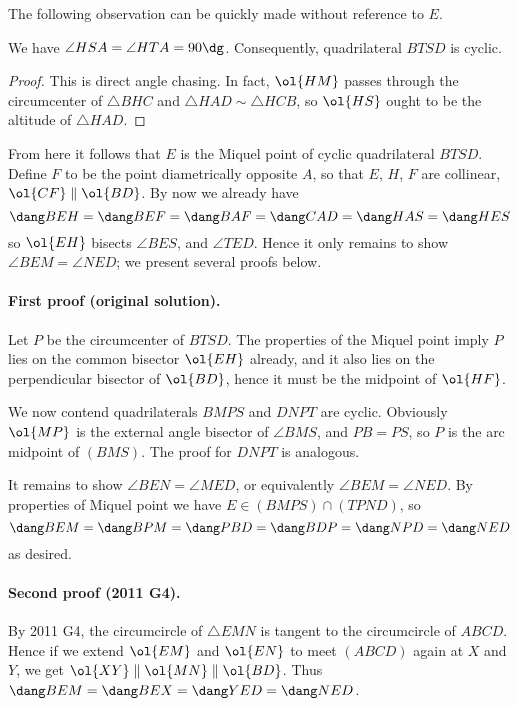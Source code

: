 The following observation can be quickly made
without reference to $E$.
\begin{lemma*}
  We have $\angle HSA = \angle HTA = 90\dg$.
  Consequently, quadrilateral $BTSD$ is cyclic.
\end{lemma*}
\begin{proof}
  This is direct angle chasing.
  In fact, $\ol{HM}$ passes through the circumcenter of $\triangle BHC$
  and $\triangle HAD \sim \triangle HCB$,
  so $\ol{HS}$ ought to be the altitude of $\triangle HAD$.
\end{proof}

From here it follows that $E$ is the Miquel point of
cyclic quadrilateral $BTSD$.
Define $F$ to be the point diametrically opposite $A$,
so that $E$, $H$, $F$ are collinear, $\ol{CF} \parallel \ol{BD}$.
By now we already have
\[ \dang BEH = \dang BEF = \dang BAF = \dang CAD = \dang HAS = \dang HES \]
so $\ol{EH}$ bisects $\angle BES$, and $\angle TED$.
Hence it only remains to show $\angle BEM = \angle NED$;
we present several proofs below.

\paragraph{First proof (original solution).}
Let $P$ be the circumcenter of $BTSD$.
The properties of the Miquel point imply $P$ lies on
the common bisector $\ol{EH}$ already,
and it also lies on the perpendicular bisector of $\ol{BD}$,
hence it must be the midpoint of $\ol{HF}$.

We now contend quadrilaterals $BMPS$ and $DNPT$ are cyclic.
Obviously $\ol{MP}$ is the external angle bisector of $\angle BMS$,
and $PB = PS$, so $P$ is the arc midpoint of $(BMS)$.
The proof for $DNPT$ is analogous.

It remains to show $\angle BEN = \angle MED$,
or equivalently $\angle BEM = \angle NED$.
By properties of Miquel point we have $E \in (BMPS) \cap (TPND)$, so
\[ \dang BEM = \dang BPM = \dang PBD = \dang BDP = \dang NPD = \dang NED \]
as desired.

\paragraph{Second proof (2011 G4).}
By 2011 G4, the circumcircle of $\triangle EMN$
is tangent to the circumcircle of $ABCD$.
Hence if we extend $\ol{EM}$ and $\ol{EN}$ to meet $(ABCD)$
again at $X$ and $Y$, we get $\ol{XY} \parallel \ol{MN} \parallel \ol{BD}$.
Thus $\dang BEM = \dang BEX = \dang YED = \dang NED$.

